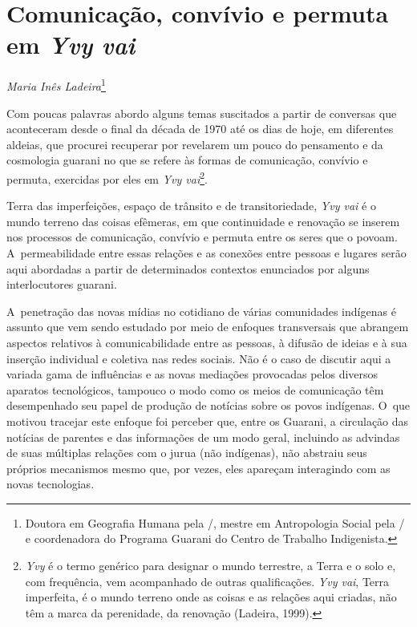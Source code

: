 \thispagestyle{empty}

\chapter*{Comunicação, convívio e permuta em \emph{Yvy vai}}


\begin{flushright}
\emph{Maria Inês Ladeira}\footnote{Doutora em Geografia Humana pela
/, mestre em Antropologia Social pela / e coordenadora do
Programa Guarani do Centro de Trabalho Indigenista.}
\end{flushright}

\noindent Com poucas palavras abordo alguns temas suscitados a partir de conversas
que aconteceram desde o final da década de 1970 até os dias de hoje, em
diferentes aldeias, que procurei recuperar por revelarem um pouco do
pensamento e da cosmologia guarani no que se refere às formas de
comunicação, convívio e permuta, exercidas por eles em \emph{Yvy
vai}\footnote{\emph{Yvy} é o termo genérico para designar o mundo terrestre, a
Terra e o solo e, com frequência, vem acompanhado de outras
qualificações. \emph{Yvy vai}, Terra imperfeita, é o mundo terreno onde as
coisas e as relações aqui criadas, não têm a marca da perenidade, da
renovação (Ladeira, 1999).}. 

Terra das imperfeições, espaço de trânsito e de transitoriedade, \emph{Yvy vai}
é o mundo terreno das coisas efêmeras, em que continuidade e renovação
se inserem nos processos de comunicação, convívio e permuta entre os
seres que o povoam. A~permeabilidade entre essas relações e as conexões
entre pessoas e lugares serão aqui abordadas a partir de determinados
contextos enunciados por alguns interlocutores guarani. 

A~penetração das novas mídias no cotidiano de várias comunidades
indígenas é assunto que vem sendo estudado por meio de enfoques
transversais que abrangem aspectos relativos à comunicabilidade entre
as pessoas, à difusão de ideias e à sua inserção individual e coletiva
nas redes sociais. Não é o caso de discutir aqui a variada gama de
influências e as novas mediações provocadas pelos diversos aparatos
tecnológicos, tampouco o modo como os meios de comunicação têm
desempenhado seu papel de produção de notícias sobre os povos
indígenas. O~que motivou tracejar este enfoque foi perceber que, entre
os Guarani, a circulação das notícias de parentes e das informações de
um modo geral, incluindo as advindas de suas múltiplas relações com o
jurua (não indígenas), não abstraiu seus próprios mecanismos mesmo que,
por vezes, eles apareçam interagindo com as novas tecnologias.

